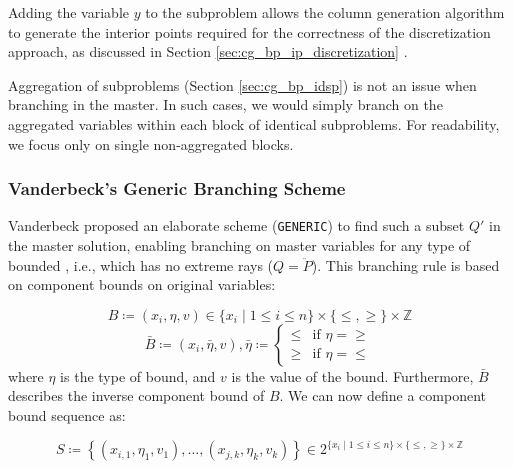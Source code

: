 \begin{note}
Adding the variable $y$ to the subproblem allows the column generation algorithm to generate the interior points required for the correctness of the discretization approach, as discussed in Section \ref{sec:cg_bp_ip_discretization} \cite{vanderbeck1996exact}.
\end{note}

\begin{note}
Aggregation of subproblems (Section \ref{sec:cg_bp_idsp}) is not an issue when branching in the master. In such cases, we would simply branch on the aggregated variables within each block of identical subproblems. For readability, we focus only on single non-aggregated blocks.
\end{note}

\subsubsection{Vanderbeck's Generic Branching Scheme}\label{sec:cg_bp_bp_branching_generic}
Vanderbeck proposed an elaborate scheme (\texttt{GENERIC}) \cite{vanderbeck2010reformulation,vanderbeck1996exact} to find such a subset $Q'$ in the master solution, enabling branching on master variables for any type of bounded \IP{}, i.e., which has no extreme rays ($Q = \ddot{P}$). This branching rule is based on component bounds on original variables:

\begin{equation}
B \coloneqq \left( x_i, \eta, v \right) \in \{x_i \mid 1 \leq i \leq n\} \times \{\leq, \geq\} \times \mathbb{Z}
\end{equation}
\begin{equation}
\bar{B} \coloneqq \left( x_i, \bar{\eta}, v \right), \bar{\eta} \coloneqq \begin{cases} \leq & \text{if } \eta = \geq \\ \geq & \text{if } \eta = \leq \end{cases}
\end{equation}
where $\eta$ is the type of bound, and $v$ is the value of the bound. Furthermore, $\bar{B}$ describes the inverse component bound of $B$. We can now define a component bound sequence as:

\begin{equation}
S \coloneqq \left\{ \left( x_{i,1}, \eta_1, v_1 \right), \dots, \left( x_{j,k}, \eta_k, v_k \right) \right\} \in 2^{\{x_i \mid 1 \leq i \leq n\} \times \{\leq, \geq\} \times \mathbb{Z}}
\end{equation}

